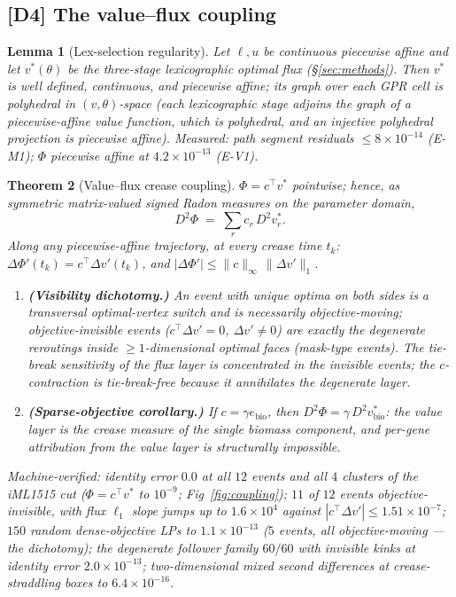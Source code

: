 \documentclass[11pt,a4paper]{article}
\theoremstyle{plain}
\newtheorem{theorem}{Theorem}[section]
\newtheorem{lemma}[theorem]{Lemma}
\theoremstyle{definition}
\theoremstyle{remark}
\begin{document}
\subsection{[D4] The value--flux coupling}

\begin{lemma}[Lex-selection regularity]\label{lem:lex}
Let $\ell, u$ be continuous piecewise affine and let $v^*(\theta)$ be
the three-stage lexicographic optimal flux (\S\ref{sec:methods}).
Then $v^*$ is well defined, continuous, and piecewise affine; its
graph over each GPR cell is polyhedral in $(v,\theta)$-space (each
lexicographic stage adjoins the graph of a piecewise-affine value
function, which is polyhedral, and an injective polyhedral projection
is piecewise affine). Measured: path segment residuals $\le 8 \times
10^{-14}$ (E-M1); $\Phi$ piecewise affine at $4.2 \times 10^{-13}$
(E-V1).
\end{lemma}

\begin{theorem}[Value--flux crease coupling]\label{thm:coupling}
$\Phi = c^\top v^*$ pointwise; hence, as symmetric matrix-valued
signed Radon measures on the parameter domain,
\[
D^2\Phi \;=\; \sum_{r} c_r\, D^2 v^*_r .
\]
Along any piecewise-affine trajectory, at every crease time $t_k$:
$\Delta\Phi'(t_k) = c^\top \Delta v'(t_k)$, and
$|\Delta\Phi'| \le \|c\|_\infty \,\|\Delta v'\|_1$.
\begin{enumerate}[label=(\roman*),leftmargin=2em]
\item \textbf{(Visibility dichotomy.)} An event with unique optima
      on both sides is a transversal optimal-vertex switch and is
      necessarily objective-moving; objective-invisible events
      ($c^\top \Delta v' = 0$, $\Delta v' \neq 0$) are exactly the
      degenerate reroutings inside $\ge 1$-dimensional optimal faces
      (mask-type events). The tie-break sensitivity of the flux layer
      is concentrated in the invisible events; the $c$-contraction is
      tie-break-free because it annihilates the degenerate layer.
\item \textbf{(Sparse-objective corollary.)} If $c =
      \gamma e_{\mathrm{bio}}$, then $D^2\Phi = \gamma\, D^2
      v^*_{\mathrm{bio}}$: the value layer is the crease measure of
      the single biomass component, and per-gene attribution from the
      value layer is structurally impossible.
\end{enumerate}
Machine-verified: identity error $0.0$ at all $12$ events and all
$4$ clusters of the iML1515 cut ($\Phi = c^\top v^*$ to $10^{-9}$;
Fig~\ref{fig:coupling});
$11$ of $12$ events objective-invisible, with flux $\ell_1$ slope
jumps up to $1.6 \times 10^{4}$ against $|c^\top \Delta v'| \le
1.51 \times 10^{-7}$; $150$ random dense-objective LPs to $1.1 \times
10^{-13}$ ($5$ events, all objective-moving --- the dichotomy); the
degenerate follower family $60/60$ with invisible kinks at identity
error $2.0 \times 10^{-13}$; two-dimensional mixed second
differences at crease-straddling boxes to $6.4 \times 10^{-16}$.
\end{theorem}
\end{document}
